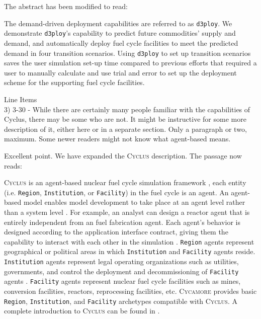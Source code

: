 \documentclass[answers,11pt]{exam}
\newcommand{\Cyclus}{\textsc{Cyclus}\xspace}%
\newcommand{\Cycamore}{\textsc{Cycamore}\xspace}%
\newcommand{\deploy}{\texttt{d3ploy}\xspace}%
\begin{document}
\begin{questions}
\begin{solution}
The abstract has been modified to read: 

The demand-driven deployment capabilities are referred to as \deploy. 
We demonstrate \deploy's capability to predict future commodities' 
supply and demand, and automatically deploy fuel 
cycle facilities to meet the predicted demand in four transition scenarios. 
Using \deploy to set up transition scenarios saves the user 
simulation set-up time compared to previous efforts that
required a user to manually calculate and use trial and error 
to set up the deployment scheme for the supporting fuel cycle 
facilities. 
\end{solution}

\question Line Items \\
3) 3-30 - While there are certainly many people familiar with the capabilities of Cyclus, there may be
some who are not. It might be instructive for some more description of it, either here or in a separate
section. Only a paragraph or two, maximum. Some newer readers might not know what agent-based
means.

\begin{solution}
Excellent point. We have expanded the \Cyclus description. The passage now reads: 

\Cyclus is an agent-based nuclear fuel cycle simulation framework 
\cite{huff_fundamental_2016}, 
each entity (i.e. \texttt{Region}, \texttt{Institution}, or \texttt{Facility}) in the 
fuel cycle is an agent. 
An agent-based model enables model development to take place at an agent level 
rather than a system level \cite{huff_fundamental_2016}. 
For example, an analyst can design a reactor agent that is entirely independent 
from an fuel fabrication agent. Each agent's behavior is designed according to the 
application interface contract, giving them the capability to interact with each 
other in the simulation \cite{huff_fundamental_2016}.  
\texttt{Region} agents represent geographical or political areas in which \texttt{Institution}
and \texttt{Facility} agents reside. 
\texttt{Institution} agents represent legal operating organizations such as
utilities, governments, and control the 
deployment and decommissioning of \texttt{Facility} agents
\cite{huff_fundamental_2016}.
\texttt{Facility} agents represent nuclear fuel cycle facilities
such as mines, conversion facilities, reactors, reprocessing facilities, 
etc. 
\Cycamore \cite{carlsen_cycamore_2014}
provides basic \texttt{Region}, \texttt{Institution}, 
and \texttt{Facility} archetypes compatible with \Cyclus. 
A complete introduction to \Cyclus can be found in \cite{huff_fundamental_2016}. 
\end{solution}


\end{questions}
\end{document}
